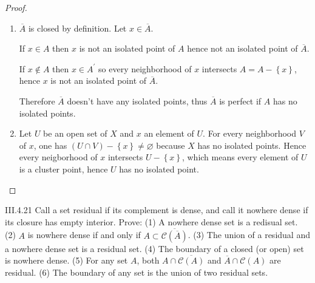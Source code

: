 \begin{proof}
    \begin{enumerate}[label={(\arabic*)}]
        \item \( \overline{A} \) is closed by definition. Let \( x \in \overline{A} \).

              If \( x \in A \) then \(x\) is not an isolated point of \(A\) hence not an isolated point of \(\overline{A}\).

              If \( x \notin A \) then \( x \in A^{\prime} \) so every neighborhood of \(x\) intersects \( A = A - \left\{x\right\} \), hence \(x\) is not an isolated point of \(\overline{A}\).

              Therefore \(\overline{A}\) doesn't have any isolated points, thus \(\overline{A}\) is perfect if \(A\) has no isolated points.
        \item Let \(U\) be an open set of \(X\) and \(x\) an element of \(U\). For every neighborhood \(V\) of \(x\), one has \( (U \cap V) - \left\{x\right\} \ne \varnothing \) because \(X\) has no isolated points. Hence every neigborhood of \(x\) intersects \( U - \left\{x\right\} \), which means every element of \(U\) is a cluster point, hence \(U\) has no isolated point.
    \end{enumerate}
\end{proof}

\begin{problem}{III.4.21}
Call a set residual if its complement is dense, and call it nowhere dense if its closure has empty interior. Prove: (1) A nowhere dense set is a redisual set. (2) \(A\) is nowhere dense if and only if \( A \subset \overline{\mathscr{C}(\overline{A})} \). (3) The union of a residual and a nowhere dense set is a residual set. (4) The boundary of a closed (or open) set is nowhere dense. (5) For any set \(A\), both \(A \cap \overline{\mathscr{C}(A)}\) and \( \overline{A} \cap \mathscr{C}(A) \) are residual. (6) The boundary of any set is the union of two residual sets.
\end{problem}

